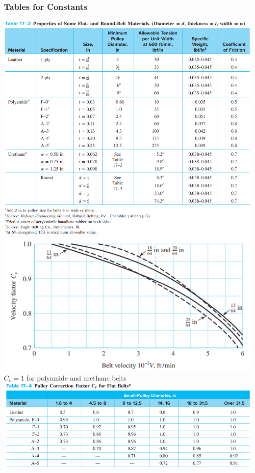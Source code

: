 \documentclass[11pt, fleqn]{article}
\begin{document}
\subsubsection{Tables for Constants}
    \includegraphics[scale = 0.5]{Belts/Table 17-2.png}\\
    \includegraphics[scale = 0.9]{Belts/Fig17-9.png}\\
    $C_v = 1$ for polyamide and urethane belts\\
    \includegraphics[scale = 0.5]{Belts/Table 17-4.png}
\end{document}
